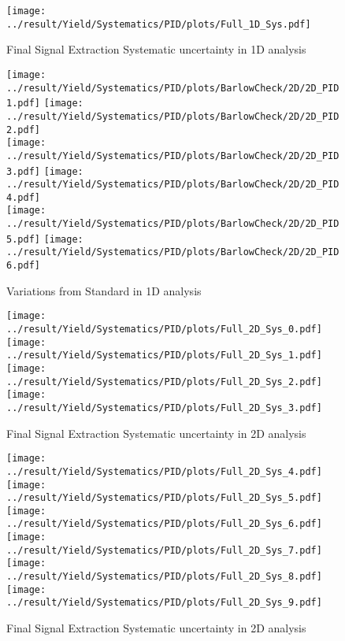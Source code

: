 \begin{figure}
	\centering
		\texttt{[image: ../result/Yield/Systematics/PID/plots/Full\_1D\_Sys.pdf]}
		\caption{Final Signal Extraction Systematic uncertainty in 1D analysis}
		\label{}
\end{figure}

\newpage
\begin{figure}
	\centering
		\texttt{[image: ../result/Yield/Systematics/PID/plots/BarlowCheck/2D/2D\_PID1.pdf]}
		\texttt{[image: ../result/Yield/Systematics/PID/plots/BarlowCheck/2D/2D\_PID2.pdf]}\\
		\texttt{[image: ../result/Yield/Systematics/PID/plots/BarlowCheck/2D/2D\_PID3.pdf]}
		\texttt{[image: ../result/Yield/Systematics/PID/plots/BarlowCheck/2D/2D\_PID4.pdf]}\\
		\texttt{[image: ../result/Yield/Systematics/PID/plots/BarlowCheck/2D/2D\_PID5.pdf]}
		\texttt{[image: ../result/Yield/Systematics/PID/plots/BarlowCheck/2D/2D\_PID6.pdf]}\\
		\caption{Variations from Standard in 1D analysis}
		\label{}
\end{figure}

\begin{figure}
	\centering
		\texttt{[image: ../result/Yield/Systematics/PID/plots/Full\_2D\_Sys\_0.pdf]}
		\texttt{[image: ../result/Yield/Systematics/PID/plots/Full\_2D\_Sys\_1.pdf]}\\
		\texttt{[image: ../result/Yield/Systematics/PID/plots/Full\_2D\_Sys\_2.pdf]}
		\texttt{[image: ../result/Yield/Systematics/PID/plots/Full\_2D\_Sys\_3.pdf]}
		\caption{Final Signal Extraction Systematic uncertainty in 2D analysis}
		\label{}
\end{figure}

\newpage
\begin{figure}
	\centering
		\texttt{[image: ../result/Yield/Systematics/PID/plots/Full\_2D\_Sys\_4.pdf]}
		\texttt{[image: ../result/Yield/Systematics/PID/plots/Full\_2D\_Sys\_5.pdf]}\\
		\texttt{[image: ../result/Yield/Systematics/PID/plots/Full\_2D\_Sys\_6.pdf]}
		\texttt{[image: ../result/Yield/Systematics/PID/plots/Full\_2D\_Sys\_7.pdf]}\\
		\texttt{[image: ../result/Yield/Systematics/PID/plots/Full\_2D\_Sys\_8.pdf]}
		\texttt{[image: ../result/Yield/Systematics/PID/plots/Full\_2D\_Sys\_9.pdf]}
		\caption{Final Signal Extraction Systematic uncertainty in 2D analysis}
		\label{}
\end{figure}

